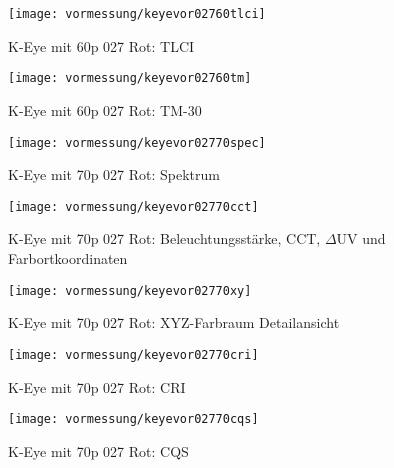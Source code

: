 \documentclass[pagesize,paper=A4,fontsize=12pt,utf8,numbers=noenddot,bibliography=totoc,listof=totoc,DIV=11,BCOR=1mm]{scrreprt}
\begin{document}
\begin{figure}[htp]     %
\centering
\texttt{[image: vormessung/keyevor02760tlci]} 
\caption {K-Eye mit 60p 027 Rot: TLCI} 
\end{figure}

\begin{figure}[htp]     %
\centering
\texttt{[image: vormessung/keyevor02760tm]} 
\caption {K-Eye mit 60p 027 Rot: TM-30} 
\end{figure}




\begin{figure}[htp]     %
\centering
\texttt{[image: vormessung/keyevor02770spec]} 
\caption {K-Eye mit 70p 027 Rot: Spektrum} 
\end{figure}

\begin{figure}[htp]     %
\centering
\texttt{[image: vormessung/keyevor02770cct]} 
\caption {K-Eye mit 70p 027 Rot: Beleuchtungsstärke, CCT, $\Delta$UV und Farbortkoordinaten} 
\end{figure}

\begin{figure}[htp]     %
\centering
\texttt{[image: vormessung/keyevor02770xy]} 
\caption {K-Eye mit 70p 027 Rot: XYZ-Farbraum Detailansicht} 
\end{figure}

\begin{figure}[htp]     %
\centering
\texttt{[image: vormessung/keyevor02770cri]} 
\caption {K-Eye mit 70p 027 Rot: CRI} 
\end{figure}

\begin{figure}[htp]     %
\centering
\texttt{[image: vormessung/keyevor02770cqs]} 
\caption {K-Eye mit 70p 027 Rot: CQS} 
\end{figure}
\end{document}
